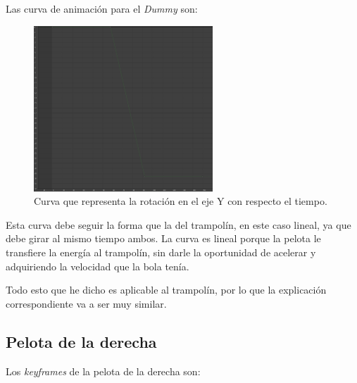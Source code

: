 \documentclass{article}
\begin{document}
\newpage

Las curva de animación para el \textit{Dummy} son:

\begin{figure}[H]
    \centering
    \includegraphics[width=0.6\textwidth]{imagenes/curvas/PL/dummy/green.png}
    \caption{Curva que representa la rotación en el eje Y con respecto el tiempo.}
 \end{figure}


Esta curva debe seguir la forma que la del trampolín, en este caso lineal, ya que debe girar al mismo tiempo ambos. La curva es lineal porque la pelota le transfiere la energía al trampolín, sin darle la oportunidad de acelerar y adquiriendo la velocidad que la bola tenía.

\bigskip

Todo esto que he dicho es aplicable al trampolín, por lo que la explicación correspondiente va a ser muy similar.

\subsection{Pelota de la derecha}
Los \textit{keyframes} de la pelota de la derecha son:
\end{document}
